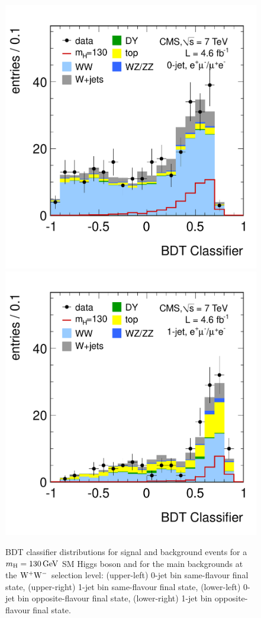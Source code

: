 \documentclass[11pt,twoside,a4paper,cmspaper,final,collab]{cms-tdr}
\begin{document}
\begin{figure}[htbp]
\begin{center}
   \includegraphics[width=\cmsFigWidth]{histo_mva_130_0j_of}
   \includegraphics[width=\cmsFigWidth]{histo_mva_130_1j_of}
       \caption{BDT classifier distributions for signal and background
events for a $m_{\mathrm{H}}=130\,\text{Ge\hspace{-.08em}V}$ SM Higgs boson and for the main backgrounds at the $\mathrm{W^+}{}\mathrm{W^-}$ selection
level: (upper-left) 0-jet bin same-flavour final state, (upper-right) 1-jet bin same-flavour final state, (lower-left) 0-jet bin opposite-flavour
final state, (lower-right) 1-jet bin opposite-flavour final state.} \label{fig:histo_mva_130}
\end{center}
\end{figure}
\end{document}
